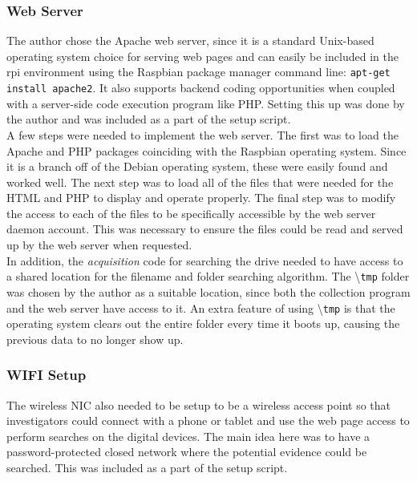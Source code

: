 \documentclass[12pt]{article}
\begin{document}
\subsubsection{Web Server}

The author chose the Apache web server, since it is a standard Unix-based operating system
choice for serving web pages and can easily be included in the \gls{rpi} environment using
the Raspbian package manager command line: \verb|apt-get install apache2|.  It also supports
backend coding opportunities when coupled with a server-side code execution program like PHP.
Setting this up was done by the author and was included as a part of the setup script.\\

A few steps were needed to implement the web server.  The first was to
load the Apache and PHP packages coinciding with the Raspbian operating system.  
Since it is a branch off of the Debian operating system, these were easily found and
worked well.  The next step was to load all of the files that were needed for
the HTML and PHP to display and operate properly.  The final step was to modify
the access to each of the files to be specifically accessible by the web
server daemon account.  This was necessary to ensure the files could be read and
served up by the web server when requested.\\

In addition, the {\em acquisition} code for searching the drive needed to have 
access to a shared location for the filename and folder searching algorithm.
The \textbackslash{}\verb|tmp| folder was chosen by the author as a suitable location, since
both the collection program and the web server have access to it.  An extra
feature of using \textbackslash{}\verb|tmp| is that the operating system clears
out the entire folder every time it boots up, causing the previous data to no
longer show up.\\

\subsubsection{WIFI Setup}

The wireless NIC also needed to be setup to be a wireless access point so that
investigators could connect with a phone or tablet and use the web page access
to perform searches on the digital devices.  The main idea here was to have a 
password-protected closed network where the potential evidence could be searched.
This was included as a part of the setup script.\\
\end{document}
